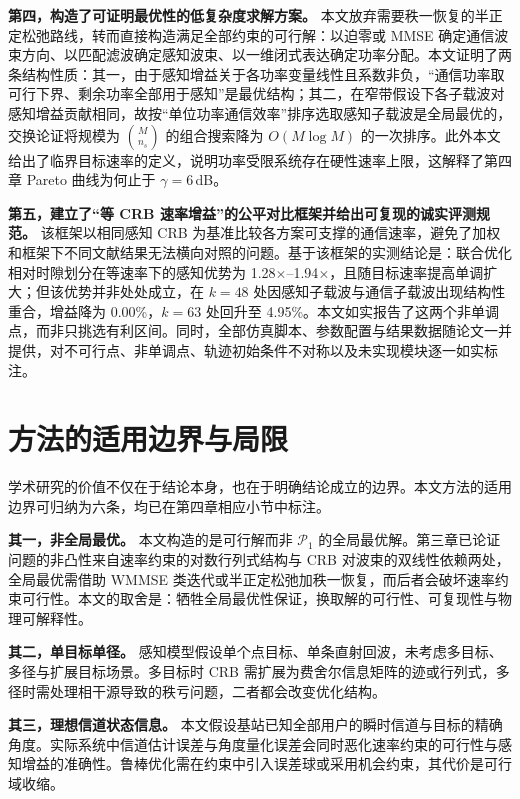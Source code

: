 \textbf{第四，构造了可证明最优性的低复杂度求解方案。} 本文放弃需要秩一恢复的半正定松弛路线，转而直接构造满足全部约束的可行解：以迫零或 MMSE 确定通信波束方向、以匹配滤波确定感知波束、以一维闭式表达确定功率分配。本文证明了两条结构性质：其一，由于感知增益关于各功率变量线性且系数非负，“通信功率取可行下界、剩余功率全部用于感知”是最优结构；其二，在窄带假设下各子载波对感知增益贡献相同，故按“单位功率通信效率”排序选取感知子载波是全局最优的，交换论证将规模为 $\binom{M}{n_s}$ 的组合搜索降为 $O(M\log M)$ 的一次排序。此外本文给出了临界目标速率的定义，说明功率受限系统存在硬性速率上限，这解释了第四章 Pareto 曲线为何止于 $\gamma=6$\,dB。

\textbf{第五，建立了“等 CRB 速率增益”的公平对比框架并给出可复现的诚实评测规范。} 该框架以相同感知 CRB 为基准比较各方案可支撑的通信速率，避免了加权和框架下不同文献结果无法横向对照的问题。基于该框架的实测结论是：联合优化相对时隙划分在等速率下的感知优势为 1.28$\times$–1.94$\times$，且随目标速率提高单调扩大；但该优势并非处处成立，在 $k=48$ 处因感知子载波与通信子载波出现结构性重合，增益降为 0.00\%，$k=63$ 处回升至 4.95\%。本文如实报告了这两个非单调点，而非只挑选有利区间。同时，全部仿真脚本、参数配置与结果数据随论文一并提供，对不可行点、非单调点、轨迹初始条件不对称以及未实现模块逐一如实标注。

\section{方法的适用边界与局限}
\label{sec:boundary}

学术研究的价值不仅在于结论本身，也在于明确结论成立的边界。本文方法的适用边界可归纳为六条，均已在第四章相应小节中标注。

\textbf{其一，非全局最优。} 本文构造的是可行解而非 $\mathcal{P}_{1}$ 的全局最优解。第三章已论证问题的非凸性来自速率约束的对数行列式结构与 CRB 对波束的双线性依赖两处，全局最优需借助 WMMSE 类迭代或半正定松弛加秩一恢复，而后者会破坏速率约束可行性。本文的取舍是：牺牲全局最优性保证，换取解的可行性、可复现性与物理可解释性。

\textbf{其二，单目标单径。} 感知模型假设单个点目标、单条直射回波，未考虑多目标、多径与扩展目标场景。多目标时 CRB 需扩展为费舍尔信息矩阵的迹或行列式，多径时需处理相干源导致的秩亏问题，二者都会改变优化结构。

\textbf{其三，理想信道状态信息。} 本文假设基站已知全部用户的瞬时信道与目标的精确角度。实际系统中信道估计误差与角度量化误差会同时恶化速率约束的可行性与感知增益的准确性。鲁棒优化需在约束中引入误差球或采用机会约束，其代价是可行域收缩。

